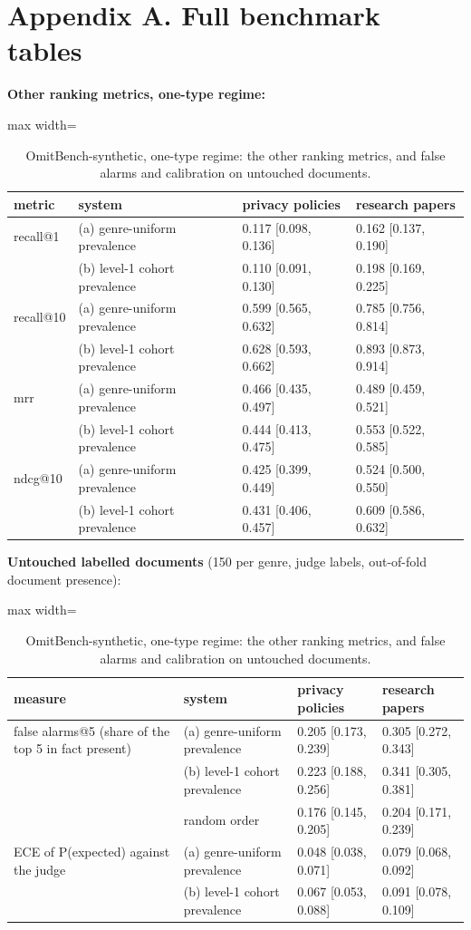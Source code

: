\documentclass[11pt,a4paper]{article}
\newcommand{\panel}[1]{\par\medskip\noindent #1\par\smallskip}
\begin{document}
\section*{Appendix A. Full benchmark tables}

\begin{table}[H]
\centering\small
\panel{\textbf{Other ranking metrics, one-type regime:}}
\begin{adjustbox}{max width=\linewidth}
\begin{tabular}{llll}
\toprule
metric & system & privacy policies & research papers \\
\midrule
recall@1 & (a) genre-uniform prevalence & 0.117 [0.098, 0.136] & 0.162 [0.137, 0.190] \\
 & (b) level-1 cohort prevalence & 0.110 [0.091, 0.130] & 0.198 [0.169, 0.225] \\
recall@10 & (a) genre-uniform prevalence & 0.599 [0.565, 0.632] & 0.785 [0.756, 0.814] \\
 & (b) level-1 cohort prevalence & 0.628 [0.593, 0.662] & 0.893 [0.873, 0.914] \\
mrr & (a) genre-uniform prevalence & 0.466 [0.435, 0.497] & 0.489 [0.459, 0.521] \\
 & (b) level-1 cohort prevalence & 0.444 [0.413, 0.475] & 0.553 [0.522, 0.585] \\
ndcg@10 & (a) genre-uniform prevalence & 0.425 [0.399, 0.449] & 0.524 [0.500, 0.550] \\
 & (b) level-1 cohort prevalence & 0.431 [0.406, 0.457] & 0.609 [0.586, 0.632] \\
\bottomrule
\end{tabular}
\end{adjustbox}
\panel{\textbf{Untouched labelled documents} (150 per genre, judge labels, out-of-fold document presence):}
\begin{adjustbox}{max width=\linewidth}
\begin{tabular}{llll}
\toprule
measure & system & privacy policies & research papers \\
\midrule
false alarms@5 (share of the top 5 in fact present) & (a) genre-uniform prevalence & 0.205 [0.173, 0.239] & 0.305 [0.272, 0.343] \\
 & (b) level-1 cohort prevalence & 0.223 [0.188, 0.256] & 0.341 [0.305, 0.381] \\
 & random order & 0.176 [0.145, 0.205] & 0.204 [0.171, 0.239] \\
ECE of P(expected) against the judge & (a) genre-uniform prevalence & 0.048 [0.038, 0.071] & 0.079 [0.068, 0.092] \\
 & (b) level-1 cohort prevalence & 0.067 [0.053, 0.088] & 0.091 [0.078, 0.109] \\
\bottomrule
\end{tabular}
\end{adjustbox}
\caption{OmitBench-synthetic, one-type regime: the other ranking metrics, and false alarms and calibration on untouched documents.}
\end{table}
\end{document}
